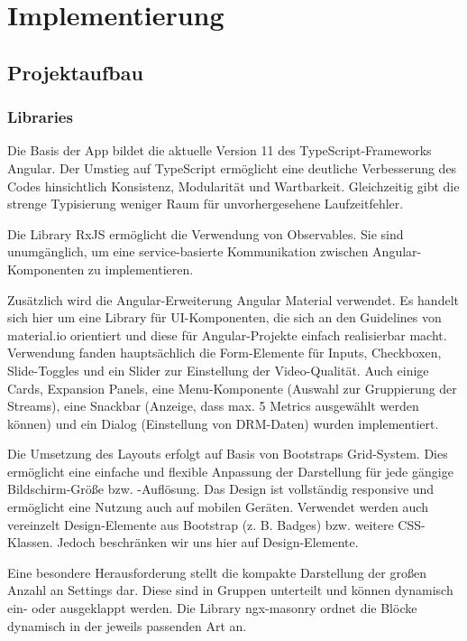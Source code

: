 \documentclass[conference]{IEEEtran}
\begin{document}
\section{Implementierung}

\subsection{Projektaufbau}
\subsubsection{Libraries}
Die Basis der App bildet die aktuelle Version 11 des TypeScript-Frameworks Angular\cite{b3}. Der Umstieg auf TypeScript ermöglicht eine deutliche Verbesserung des Codes hinsichtlich Konsistenz, Modularität und Wartbarkeit. Gleichzeitig gibt die strenge Typisierung weniger Raum für unvorhergesehene Laufzeitfehler.

Die Library RxJS ermöglicht die Verwendung von Observables\cite{b6}. Sie sind unumgänglich, um eine service-basierte Kommunikation zwischen Angular-Komponenten zu implementieren.

Zusätzlich wird die Angular-Erweiterung Angular Material\cite{b4} verwendet. Es handelt sich hier um eine Library für UI-Komponenten, die sich an den Guidelines von material.io\cite{b5} orientiert und diese für Angular-Projekte einfach realisierbar macht. Verwendung fanden hauptsächlich die Form-Elemente für Inputs, Checkboxen, Slide-Toggles und ein Slider zur Einstellung der Video-Qualität. Auch einige Cards, Expansion Panels, eine Menu-Komponente (Auswahl zur Gruppierung der Streams), eine Snackbar (Anzeige, dass max. 5 Metrics ausgewählt werden können) und ein Dialog (Einstellung von DRM-Daten) wurden implementiert.

Die Umsetzung des Layouts erfolgt auf Basis von Bootstraps Grid-System\cite{b7}. Dies ermöglicht eine einfache und flexible Anpassung der Darstellung für jede gängige Bildschirm-Größe bzw. -Auflösung. Das Design ist vollständig responsive und ermöglicht eine Nutzung auch auf mobilen Geräten. Verwendet werden auch vereinzelt Design-Elemente aus Bootstrap (z. B. Badges) bzw. weitere CSS-Klassen. Jedoch beschränken wir uns hier auf Design-Elemente.

Eine besondere Herausforderung stellt die kompakte Darstellung der großen Anzahl an Settings dar. Diese sind in Gruppen unterteilt und können dynamisch ein- oder ausgeklappt werden. Die Library ngx-masonry\cite{b8} ordnet die Blöcke dynamisch in der jeweils passenden Art an.
\end{document}
